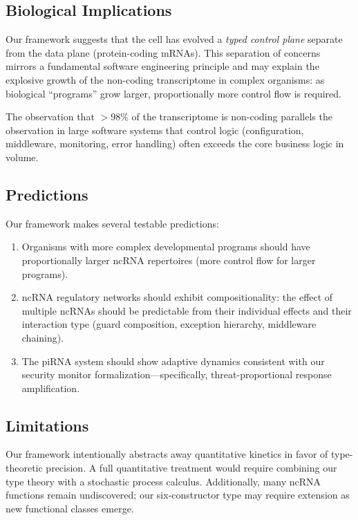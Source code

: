 \documentclass[12pt,a4paper]{article}
\theoremstyle{definition}
\begin{document}
\subsection{Biological Implications}

Our framework suggests that the cell has evolved a \emph{typed control
plane} separate from the data plane (protein-coding mRNAs).  This
separation of concerns mirrors a fundamental software engineering
principle and may explain the explosive growth of the non-coding
transcriptome in complex organisms: as biological ``programs'' grow
larger, proportionally more control flow is required.

The observation that $>98\%$ of the transcriptome is non-coding
parallels the observation in large software systems that control
logic (configuration, middleware, monitoring, error handling) often
exceeds the core business logic in volume.

\subsection{Predictions}

Our framework makes several testable predictions:

\begin{enumerate}[label=(\roman*)]
  \item Organisms with more complex developmental programs should
    have proportionally larger ncRNA repertoires (more control flow
    for larger programs).
  \item ncRNA regulatory networks should exhibit compositionality:
    the effect of multiple ncRNAs should be predictable from their
    individual effects and their interaction type (guard composition,
    exception hierarchy, middleware chaining).
  \item The piRNA system should show adaptive dynamics consistent with
    our security monitor formalization---specifically,
    threat-proportional response amplification.
\end{enumerate}

\subsection{Limitations}

Our framework intentionally abstracts away quantitative kinetics in
favor of type-theoretic precision.  A full quantitative treatment
would require combining our type theory with a stochastic process
calculus.  Additionally, many ncRNA functions remain undiscovered;
our six-constructor type may require extension as new functional
classes emerge.
\end{document}
